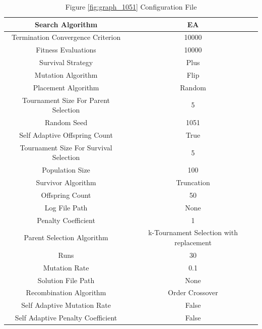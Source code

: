 \documentclass{standalone}
\begin{document}
\clearpage
\begin{table}[!htb]
	\centering
	\caption{Figure \ref{fig:graph_1051} Configuration File}
	\label{tab:graph_1051}
	\begin{tabular}{| c | c |}
		\hline
		Search Algorithm		& EA		 \\
		\hline
		Termination Convergence Criterion		& 10000		 \\
		\hline
		Fitness Evaluations		& 10000		 \\
		\hline
		Survival Strategy		& Plus		 \\
		\hline
		Mutation Algorithm		& Flip		 \\
		\hline
		Placement Algorithm		& Random		 \\
		\hline
		Tournament Size For Parent Selection		& 5		 \\
		\hline
		Random Seed		& 1051		 \\
		\hline
		Self Adaptive Offspring Count		& True		 \\
		\hline
		Tournament Size For Survival Selection		& 5		 \\
		\hline
		Population Size		& 100		 \\
		\hline
		Survivor Algorithm		& Truncation		 \\
		\hline
		Offspring Count		& 50		 \\
		\hline
		Log File Path		& None		 \\
		\hline
		Penalty Coefficient		& 1		 \\
		\hline
		Parent Selection Algorithm		& k-Tournament Selection with replacement		 \\
		\hline
		Runs		& 30		 \\
		\hline
		Mutation Rate		& 0.1		 \\
		\hline
		Solution File Path		& None		 \\
		\hline
		Recombination Algorithm		& Order Crossover		 \\
		\hline
		Self Adaptive Mutation Rate		& False		 \\
		\hline
		Self Adaptive Penalty Coefficient		& False		 \\
		\hline
	\end{tabular}
\end{table}
\end{document}
